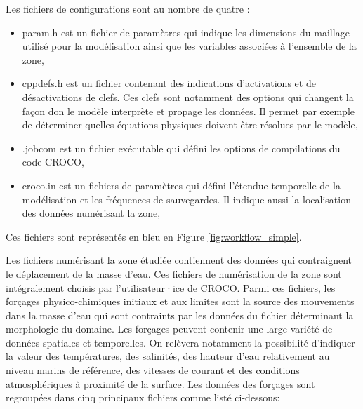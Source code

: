 \documentclass[10pt,a4paper,titlepage]{article}
\begin{document}
Les fichiers de configurations sont au nombre de quatre :
\begin{itemize}
    \item param.h est un fichier de paramètres qui indique les dimensions du maillage utilisé pour la modélisation ainsi que les variables associées à l'ensemble de la zone,
    \item cppdefs.h est un fichier contenant des indications d'activations et de désactivations de clefs. Ces clefs sont notamment des options qui changent la façon don le modèle interprète et propage les données. Il permet par exemple de déterminer quelles équations physiques doivent être résolues par le modèle,
    \item .jobcom est un fichier exécutable qui défini les options de compilations du code CROCO,
    \item croco.in est un fichiers de paramètres qui défini l'étendue temporelle de la modélisation et les fréquences de sauvegardes. Il indique aussi la localisation des données numérisant la zone,
\end{itemize}
Ces fichiers sont représentés en bleu en Figure \ref{fig:workflow_simple}.

Les fichiers numérisant la zone étudiée contiennent des données qui contraignent le déplacement de la masse d'eau.
Ces fichiers de numérisation de la zone sont intégralement choisis par l'utilisateur·ice de CROCO.
Parmi ces fichiers, les forçages physico-chimiques initiaux et aux limites sont la source des mouvements dans la masse d'eau qui sont contraints par les données du fichier déterminant la morphologie du domaine.
Les forçages peuvent contenir une large variété de données spatiales et temporelles.
On relèvera notamment la possibilité d'indiquer la valeur des températures, des salinités, des hauteur d'eau relativement au niveau marins de référence, des vitesses de courant et des conditions atmosphériques à proximité de la surface.
Les données des forçages sont regroupées dans cinq principaux fichiers comme listé ci-dessous:
\end{document}
